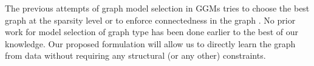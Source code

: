 The previous attempts of graph model selection in GGMs tries to choose the best graph at the sparsity level \citep{lartigue2020gaussian} or to enforce connectedness in the graph \citep{foygel2010extended}.  No prior work for model selection of graph type has been done earlier to the best of our knowledge. Our proposed formulation will allow us to directly learn the graph from data without requiring any structural (or any other) constraints.
